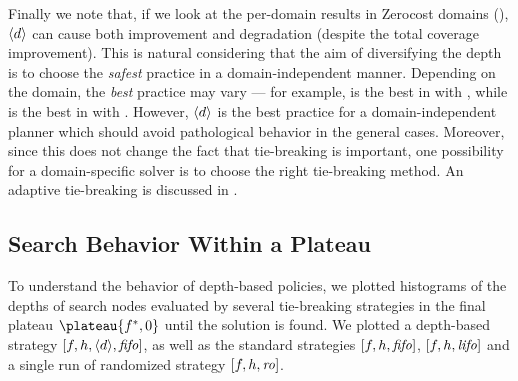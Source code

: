 Finally we note that, if we look at the per-domain results in Zerocost domains (),
${\left<d\right>}$ can cause both improvement and degradation (despite the total coverage improvement).
This is natural considering that the aim of diversifying the depth is to choose the \emph{safest} practice in a domain-independent manner.
Depending on the domain, the \emph{best} practice may vary --- for example,
 \fifo is the best in  with \lmcut, while
 \lifo is the best in  with \lmcut.
 However, ${\left<d\right>}$ is the best practice for a domain-independent planner which should avoid pathological behavior in the general cases.
 Moreover, since this does not change the fact that tie-breaking is important,
 one possibility for a domain-specific solver is to choose the right tie-breaking method.
 An adaptive tie-breaking is discussed in .




\clearpage

\subsection{Search Behavior Within a Plateau}

To understand the behavior of depth-based policies, we plotted 
histograms of the depths of search nodes evaluated by several tie-breaking
strategies in the final plateau $\plateau{f^*,0}$ until the solution is
found.  We plotted a depth-based strategy
$[f,h,{\left<d\right>},{\text{\textit{fifo}}}]$, as well as the standard strategies $[f,h,{\text{\textit{fifo}}}]$,
$[f,h,{\text{\textit{lifo}}}]$ and a single run of randomized strategy $[f,h,{\text{\textit{ro}}}]$.

